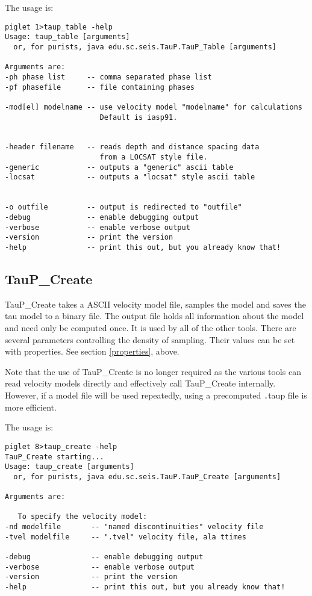 The usage is:
\begin{verbatim}
piglet 1>taup_table -help
Usage: taup_table [arguments]
  or, for purists, java edu.sc.seis.TauP.TauP_Table [arguments]

Arguments are:
-ph phase list     -- comma separated phase list
-pf phasefile      -- file containing phases

-mod[el] modelname -- use velocity model "modelname" for calculations
                      Default is iasp91.


-header filename   -- reads depth and distance spacing data
                      from a LOCSAT style file.
-generic           -- outputs a "generic" ascii table
-locsat            -- outputs a "locsat" style ascii table


-o outfile         -- output is redirected to "outfile"
-debug             -- enable debugging output
-verbose           -- enable verbose output
-version           -- print the version
-help              -- print this out, but you already know that!
\end{verbatim}

\subsection{TauP\_Create}

TauP\_Create takes a ASCII velocity model file, samples the model
 and saves the tau model to a binary file. 
The output file holds all 
information about the model and need only be computed once. It
is used by all of the other tools. There are several parameters controlling
the density of sampling. Their values can be set with properties. See section
\ref{properties}, above.

Note that the use of TauP\_Create is no longer required as the various tools can read velocity models directly
and effectively call TauP\_Create internally. However, if a model file will be used repeatedly, using a
precomputed {\texttt .taup} file is more efficient.

The usage is:
\begin{verbatim}
piglet 8>taup_create -help
TauP_Create starting...
Usage: taup_create [arguments]
  or, for purists, java edu.sc.seis.TauP.TauP_Create [arguments]

Arguments are:

   To specify the velocity model:
-nd modelfile       -- "named discontinuities" velocity file
-tvel modelfile     -- ".tvel" velocity file, ala ttimes

-debug              -- enable debugging output
-verbose            -- enable verbose output
-version            -- print the version
-help               -- print this out, but you already know that!
\end{verbatim} 
 
